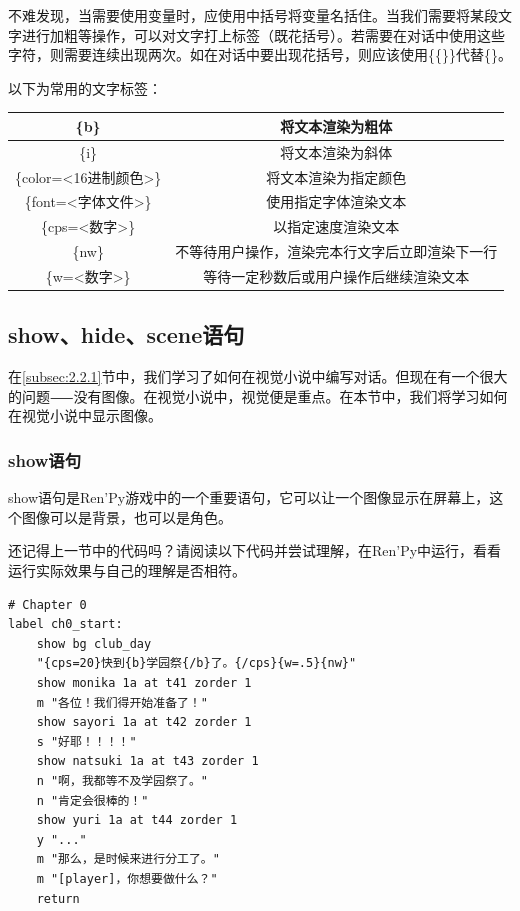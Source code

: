 \documentclass[../../Main.tex]{subfiles}
\begin{document}
不难发现，当需要使用变量时，应使用中括号将变量名括住。当我们需要将某段文字进行加粗等操作，可以对文字打上标签（既花括号）。若需要在对话中使用这些字符，则需要连续出现两次。如在对话中要出现花括号，则应该使用\{\{\}\}代替\{\}。

以下为常用的文字标签：

\begin{center}
    \tabletail{\hline}
    \tablelasttail{\hline}
    \label{table:2.2.1}
    \begin{supertabular}{|c|c|}
        \hline
        \{b\} & 将文本渲染为粗体 \\
        \hline
        \{i\} & 将文本渲染为斜体 \\
        \hline
        \{color=<16进制颜色>\} & 将文本渲染为指定颜色 \\
        \hline
        \{font=<字体文件>\} & 使用指定字体渲染文本 \\
        \hline
        \{cps=<数字>\} & 以指定速度渲染文本 \\
        \hline
        \{nw\} & 不等待用户操作，渲染完本行文字后立即渲染下一行 \\
        \hline
        \{w=<数字>\} & 等待一定秒数后或用户操作后继续渲染文本 \\
        \hline
    \end{supertabular}
\end{center}

\subsection{show、hide、scene语句}

在\ref{subsec:2.2.1}节中，我们学习了如何在视觉小说中编写对话。但现在有一个很大的问题⸺没有图像。在视觉小说中，视觉便是重点。在本节中，我们将学习如何在视觉小说中显示图像。

\subsubsection{show语句}

show语句是Ren'Py游戏中的一个重要语句，它可以让一个图像显示在屏幕上，这个图像可以是背景，也可以是角色。

还记得上一节中的代码吗？请阅读以下代码并尝试理解，在Ren'Py中运行，看看运行实际效果与自己的理解是否相符。

\begin{lstlisting}[caption=script-ch1.rpy, label={lst:2.3}]
# Chapter 0
label ch0_start:
    show bg club_day
    "{cps=20}快到{b}学园祭{/b}了。{/cps}{w=.5}{nw}"
    show monika 1a at t41 zorder 1
    m "各位！我们得开始准备了！"
    show sayori 1a at t42 zorder 1
    s "好耶！！！！"
    show natsuki 1a at t43 zorder 1
    n "啊，我都等不及学园祭了。"
    n "肯定会很棒的！"
    show yuri 1a at t44 zorder 1
    y "..."
    m "那么，是时候来进行分工了。"
    m "[player]，你想要做什么？"
    return
\end{lstlisting}
\end{document}
